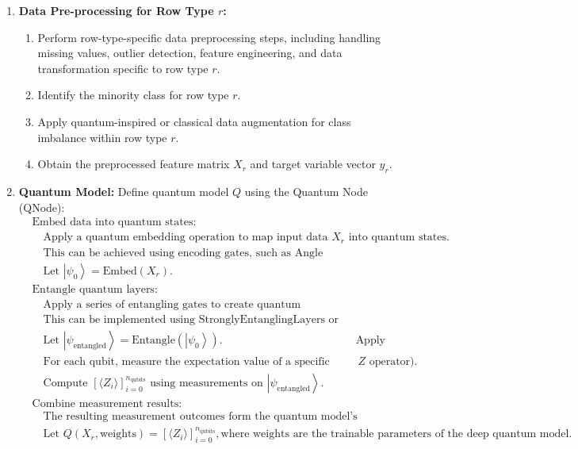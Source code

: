 \documentclass[a4paper]{article}
\begin{document}
\begin{enumerate}[label=\arabic*.]
\item \textbf{Data Pre-processing for Row Type $r$:}
	\begin{enumerate}[label=\alph*.]
	\item[] Perform row-type-specific data preprocessing steps, including handling missing values,
	outlier detection, feature engineering, and data transformation specific to row type $r$.
	\item[] Identify the minority class for row type $r$.
	\item[] Apply quantum-inspired or classical data augmentation for class imbalance within row type $r$.
	\item[] Obtain the preprocessed feature matrix $X_r$ and target variable vector $y_r$.
	\end{enumerate}		
\item \textbf{Quantum Model:}
Define quantum model $Q$ using the Quantum Node (QNode):
\begin{align*}
	&\text{Embed data into quantum states:} \\ 
	&\quad \text{Apply a quantum embedding operation to map input data } X_r \text{ into quantum states.} \\
	&\quad \text{This can be achieved using encoding gates, such as Angle Embedding or Amplitude Embedding.} \\
	&\quad \text{Let } \left| \psi_0 \right\rangle = \text{Embed}(X_r). \\
	&\text{Entangle quantum layers:} \\ 
	&\quad \text{Apply a series of entangling gates to create quantum entanglement between qubits.} \\
	&\quad \text{This can be implemented using StronglyEntanglingLayers or custom entangling gates.} \\
	&\quad \text{Let } \left| \psi_{\text{entangled}} \right\rangle = \text{Entangle}(\left| \psi_0 \right\rangle).
	&\text{Apply measurement operators:} \\ 
	&\quad \text{For each qubit, measure the expectation value of a specific observable (e.g., } Z \text{ operator).} \\
	&\quad \text{Compute } \left[ \langle Z_i \rangle \right]_{i=0}^{n_{\text{qubits}}} \text{ using measurements on } \left| \psi_{\text{entangled}} \right\rangle. \\
	&\text{Combine measurement results:} \\ 
	&\quad \text{The resulting measurement outcomes form the quantum model's predictions for each qubit.} \\
	&\quad \text{Let } Q(X_r, \text{weights}) = \left[ \langle Z_i \rangle \right]_{i=0}^{n_{\text{qubits}}}, \text{where $\text{weights}$ are the trainable parameters of the deep quantum model.}
\end{align*}


\end{enumerate}
\end{document}
